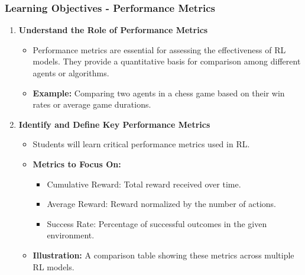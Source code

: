 \documentclass{beamer}
\begin{document}
\begin{frame}[fragile]
    \frametitle{Learning Objectives - Performance Metrics}
    \begin{enumerate}
        \item \textbf{Understand the Role of Performance Metrics}
        \begin{itemize}
            \item Performance metrics are essential for assessing the effectiveness of RL models. They provide a quantitative basis for comparison among different agents or algorithms.
            \item \textbf{Example:} Comparing two agents in a chess game based on their win rates or average game durations.
        \end{itemize}
        
        \item \textbf{Identify and Define Key Performance Metrics}
        \begin{itemize}
            \item Students will learn critical performance metrics used in RL.
            \item \textbf{Metrics to Focus On:}
            \begin{itemize}
                \item Cumulative Reward: Total reward received over time.
                \item Average Reward: Reward normalized by the number of actions.
                \item Success Rate: Percentage of successful outcomes in the given environment.
            \end{itemize}
            \item \textbf{Illustration:} A comparison table showing these metrics across multiple RL models.
        \end{itemize}
    \end{enumerate}
\end{frame}
\end{document}
